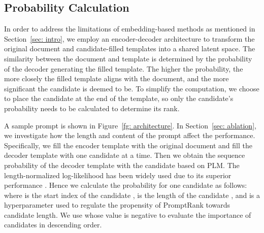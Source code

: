 \documentclass[11pt]{article}
\begin{document}
\subsection{Probability Calculation} 

In order to address the limitations of embedding-based methods as mentioned in Section~\ref{sec: intro}, we employ an encoder-decoder architecture to transform the original document and candidate-filled templates into a shared latent space. The similarity between the document and template is determined by the probability of the decoder generating the filled template. The higher the probability, the more closely the filled template aligns with the document, and the more significant the candidate is deemed to be. To simplify the computation, we choose to place the candidate at the end of the template, so only the candidate's probability needs to be calculated to determine its rank.


A sample prompt is shown in Figure~\ref{fg: architecture}. In Section~\ref{sec: ablation}, we investigate how the length and content of the prompt affect the performance. Specifically, we fill the encoder template with the original document and fill the decoder template with one candidate at a time. Then we obtain the sequence probability  of the decoder template with the candidate based on PLM.
The length-normalized log-likelihood has been widely used due to its superior performance \cite{mao-etal-2019-improving, NEURIPS2020_1457c0d6, oluwatobi-mueller-2020-dlgnet}. Hence we calculate the probability for one candidate as follows:  
where  is the start index of the candidate ,  is the length of the candidate , and  is a hyperparameter used to regulate the propensity of PromptRank towards candidate length. We use  whose value is negative to evaluate the importance of candidates in descending order. 
\end{document}
